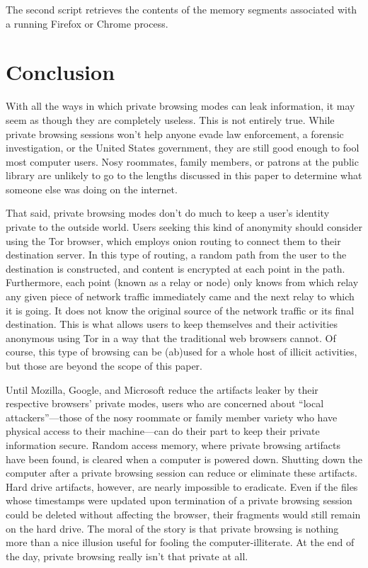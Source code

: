 \documentclass[pdftex,letterpaper,titlepage,12pt]{article}
\begin{document}
	The second script retrieves the contents of the memory segments associated
	with a running Firefox or Chrome process.

  \section{Conclusion}
  With all the ways in which private browsing modes can leak information, it
  may seem as though they are completely useless. This is not entirely true.
  While private browsing sessions won't help anyone evade law enforcement, a
  forensic investigation, or the United States government, they are still good
  enough to fool most computer users. Nosy roommates, family members, or
  patrons at the public library are unlikely to go to the lengths discussed in
  this paper to determine what someone else was doing on the internet.

  That said, private browsing modes don't do much to keep a user's identity
  private to the outside world. Users seeking this kind of anonymity should 
  consider using the Tor browser, which employs onion routing to connect them 
  to their destination server. In this type of routing, a random path from the 
  user to the destination is constructed, and content is encrypted at each 
  point in the path. Furthermore, each point (known as a relay or node) only 
  knows from which relay any given piece of network traffic immediately came 
  and the next relay to which it is going. It does not know the original source
  of the network traffic or its final destination. This is what allows users to
  keep themselves and their activities anonymous using Tor in a way that the 
  traditional web browsers cannot.\cite{tor13} Of course, this type of browsing
  can be (ab)used for a whole host of illicit activities, but those are beyond
  the scope of this paper.

  Until Mozilla, Google, and Microsoft reduce the artifacts leaker by their
  respective browsers' private modes, users who are concerned about ``local 
  attackers''---those of the nosy roommate or family member variety who have 
  physical access to their machine---can do their part to keep their private
  information secure. Random access memory, where private browsing artifacts
  have been found, is cleared when a computer is powered down. Shutting down
  the computer after a private browsing session can reduce or eliminate these
  artifacts. Hard drive artifacts, however, are nearly impossible to eradicate.
  Even if the files whose timestamps were updated upon termination of a 
  private browsing session could be deleted without affecting the browser, 
  their fragments would still remain on the hard drive. The moral of the story 
  is that private browsing is nothing more than a nice illusion useful for 
  fooling the computer-illiterate. At the end of the day, private browsing 
  really isn't that private at all.
\end{document}
